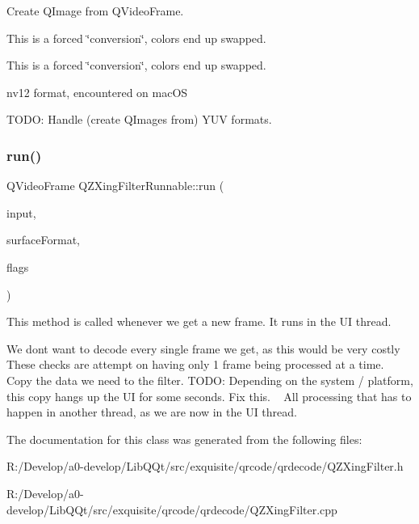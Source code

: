 Create Q\+Image from Q\+Video\+Frame.

This is a forced \char`\"{}conversion\char`\"{}, colors end up swapped.

This is a forced \char`\"{}conversion\char`\"{}, colors end up swapped.

nv12 format, encountered on mac\+OS

T\+O\+DO\+: Handle (create Q\+Images from) Y\+UV formats. \mbox{\label{class_q_z_xing_filter_runnable_a30cc32aa9a434b5d2ebfe3fcda4ad8cb}} 
\subsubsection{\texorpdfstring{run()}{run()}}
{\footnotesize\ttfamily Q\+Video\+Frame Q\+Z\+Xing\+Filter\+Runnable\+::run (\begin{DoxyParamCaption}\item[{Q\+Video\+Frame $\ast$}]{input,  }\item[{const Q\+Video\+Surface\+Format \&}]{surface\+Format,  }\item[{Run\+Flags}]{flags }\end{DoxyParamCaption})}



This method is called whenever we get a new frame. It runs in the UI thread. 

We dont want to decode every single frame we get, as this would be very costly These checks are attempt on having only 1 frame being processed at a time. ~\newline
~\newline
 Copy the data we need to the filter. T\+O\+DO\+: Depending on the system / platform, this copy hangs up the UI for some seconds. Fix this. ~\newline
 All processing that has to happen in another thread, as we are now in the UI thread. 

The documentation for this class was generated from the following files\+:\begin{DoxyCompactItemize}
\item 
R\+:/\+Develop/a0-\/develop/\+Lib\+Q\+Qt/src/exquisite/qrcode/qrdecode/Q\+Z\+Xing\+Filter.\+h\item 
R\+:/\+Develop/a0-\/develop/\+Lib\+Q\+Qt/src/exquisite/qrcode/qrdecode/Q\+Z\+Xing\+Filter.\+cpp\end{DoxyCompactItemize}
